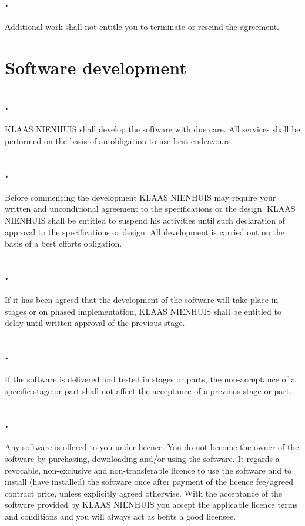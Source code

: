 \documentclass[letterpaper,10pt,english]{sphinxmanual}
\begin{document}
\section{.}
\label{Delivery:id5}
Additional work shall not entitle you to terminate or rescind the agreement.


\chapter{Software development}
\label{Development::doc}\label{Development:software-development}

\section{.}
\label{Development:id1}
KLAAS NIENHUIS shall develop the software with due care. All services shall be performed on the basis of an obligation to use best endeavours.


\section{.}
\label{Development:id2}
Before commencing the development KLAAS NIENHUIS may require your written and unconditional agreement to the specifications or the design. KLAAS NIENHUIS shall be entitled to suspend his activities until such declaration of approval to the specifications or design. All development is carried out on the basis of a best efforts obligation.


\section{.}
\label{Development:id3}
If it has been agreed that the development of the software will take place in stages or on phased implementation, KLAAS NIENHUIS shall be entitled to delay until written approval of the previous stage.


\section{.}
\label{Development:id4}
If the software is delivered and tested in stages or parts, the non-acceptance of a specific stage or part shall not affect the acceptance of a previous stage or part.


\section{.}
\label{Development:id5}
Any software is offered to you under licence. You do not become the owner of the software by purchasing, downloading and/or using the software. It regards a revocable, non-exclusive and non-transferable licence to use the software and to install (have installed) the software once after payment of the licence fee/agreed contract price, unless explicitly agreed otherwise. With the acceptance of the software provided by KLAAS NIENHUIS you accept the applicable licence terms and conditions and you will always act as befits a good licensee.
\end{document}
